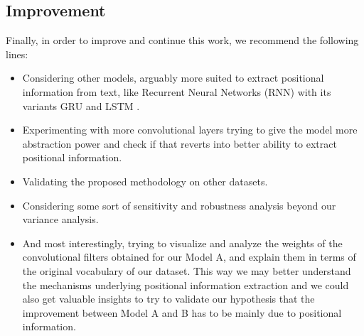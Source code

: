 \documentclass[10pt,journal,compsoc, onecolumn]{IEEEtran}
\begin{document}
\subsection{Improvement}

Finally, in order to improve and continue this work, we recommend the following lines:

\begin{itemize}
    \item Considering other models, arguably more suited to extract positional information from text, like Recurrent Neural Networks (RNN) with its variants GRU and LSTM \cite{Chollet}.
    \item Experimenting with more convolutional layers trying to give the model more abstraction power and check if that reverts into better ability to extract positional information.
    \item Validating the proposed methodology on other datasets.
    \item Considering some sort of sensitivity and robustness analysis beyond our variance analysis.
    \item And most interestingly, trying to visualize and analyze the weights of the convolutional filters obtained for our Model A, and explain them in terms of the original vocabulary of our dataset. This way we may better understand the mechanisms underlying positional information extraction and we could also get valuable insights to try to validate our hypothesis that the improvement between Model A and B has to be mainly due  to positional information.
\end{itemize}

\clearpage
\tableofcontents
\listoffigures
\listoftables
\clearpage
%
%
%
%
\printbibliography
\nocite{*}
\end{document}
